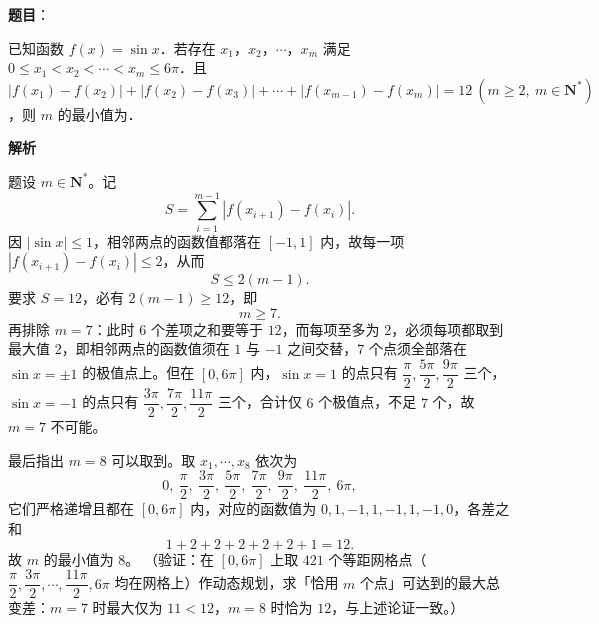 \begin{answer}

\textbf{题目}：

已知函数 \(f(x)=\sin x\)．若存在 \(x_{1}\)，\(x_{2}\)，\(\cdots\)，\(x_{m}\) 满足 \(0\leqslant x_{1}<x_{2}<\cdots<x_{m}\leqslant 6\pi\)．且 \(|f(x_{1})-f(x_{2})|+|f(x_{2})-f(x_{3})|+\cdots+|f(x_{m-1})-f(x_{m})|=12\ (m\geqslant 2,\ m\in\mathbf{N}^{*})\)，则 \(m\) 的最小值为\gkblank{}．

\textbf{解析}

题设 \(m\in\mathbf{N}^{*}\)。记
\nopagebreak[4]
\[
S=\sum_{i=1}^{m-1}\left|f(x_{i+1})-f(x_{i})\right|.
\]
因 \(|\sin x|\leqslant1\)，相邻两点的函数值都落在 \([-1,1]\) 内，故每一项 \(|f(x_{i+1})-f(x_{i})|\leqslant2\)，从而
\nopagebreak[4]
\[
S\leqslant2(m-1).
\]
要求 \(S=12\)，必有 \(2(m-1)\geqslant12\)，即
\nopagebreak[4]
\[
m\geqslant7.
\]
再排除 \(m=7\)：此时 \(6\) 个差项之和要等于 \(12\)，而每项至多为 \(2\)，必须每项都取到最大值 \(2\)，即相邻两点的函数值须在 \(1\) 与 \(-1\) 之间交替，\(7\) 个点须全部落在 \(\sin x=\pm1\) 的极值点上。但在 \([0,6\pi]\) 内，\(\sin x=1\) 的点只有 \(\dfrac{\pi}{2},\dfrac{5\pi}{2},\dfrac{9\pi}{2}\) 三个，\(\sin x=-1\) 的点只有 \(\dfrac{3\pi}{2},\dfrac{7\pi}{2},\dfrac{11\pi}{2}\) 三个，合计仅 \(6\) 个极值点，不足 \(7\) 个，故 \(m=7\) 不可能。

最后指出 \(m=8\) 可以取到。取 \(x_{1},\cdots,x_{8}\) 依次为
\nopagebreak[4]
\[
0,\ \frac{\pi}{2},\ \frac{3\pi}{2},\ \frac{5\pi}{2},\ \frac{7\pi}{2},\ \frac{9\pi}{2},\ \frac{11\pi}{2},\ 6\pi,
\]
它们严格递增且都在 \([0,6\pi]\) 内，对应的函数值为 \(0,1,-1,1,-1,1,-1,0\)，各差之和
\nopagebreak[4]
\[
1+2+2+2+2+2+1=12.
\]
故 \(m\) 的最小值为 \(8\)。
（验证：在 \([0,6\pi]\) 上取 \(421\) 个等距网格点（\(\dfrac{\pi}{2},\dfrac{3\pi}{2},\cdots,\dfrac{11\pi}{2},6\pi\) 均在网格上）作动态规划，求「恰用 \(m\) 个点」可达到的最大总变差：\(m=7\) 时最大仅为 \(11<12\)，\(m=8\) 时恰为 \(12\)，与上述论证一致。）


\end{answer}
